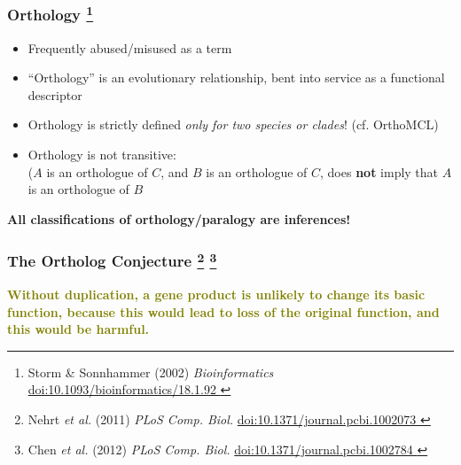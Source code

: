 % 
\begin{frame}
  \frametitle{Orthology
    \footnote{\tiny{Storm \& Sonnhammer (2002) \textit{Bioinformatics} \href{http://dx.doi.org/10.1093/bioinformatics/18.1.92}{doi:10.1093/bioinformatics/18.1.92
    }}}
    }
  \begin{itemize}
    \item \textcolor{RawSienna}{Frequently abused/misused as a term}
    \item \textcolor{hutton_green}{``Orthology'' is an evolutionary relationship, bent into service as a functional descriptor}
    \item \textcolor{hutton_blue}{Orthology is strictly defined \textit{only for two species or clades}! (cf. OrthoMCL)}
    \item \textcolor{hutton_purple}{Orthology is not transitive: \\ ($A$ is an orthologue of $C$, and $B$ is an orthologue of $C$, does \textbf{not} imply that $A$ is an orthologue of $B$}
  \end{itemize}
  \textbf{All classifications of orthology/paralogy are inferences!}
\end{frame}

%
\begin{frame}
  \frametitle{The Ortholog Conjecture
    \footnote{\tiny{Nehrt \textit{et al.} (2011) \textit{PLoS Comp. Biol.} \href{http://dx.doi.org/10.1371/journal.pcbi.1002073}{doi:10.1371/journal.pcbi.1002073
    }}}  
    \footnote{\tiny{Chen \textit{et al.} (2012) \textit{PLoS Comp. Biol.} \href{http://dx.doi.org/10.1371/journal.pcbi.1002784}{doi:10.1371/journal.pcbi.1002784
    }}}  
  }
  \Large{
    \textcolor{olive}{
      \textbf{
      Without duplication, a gene product is unlikely to change its basic function, because this would lead to loss of the original function, and this would be harmful.
      }
    }
  }
\end{frame}

